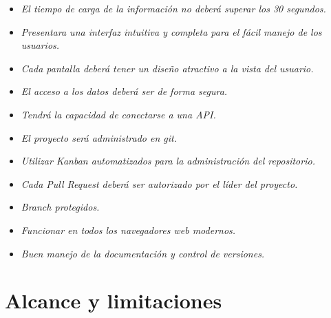 \documentclass[12pt,a4paper]{book}
\begin{document}
\begin{itemize}
\item \textit{El tiempo de carga de la información no deberá superar los 30 segundos.}
\item \textit{Presentara una interfaz intuitiva y completa para el fácil manejo de los usuarios.}
\item \textit{Cada pantalla deberá tener un diseño atractivo a la vista del usuario.}
\item \textit{El acceso a los datos deberá ser de forma segura.}
\item \textit{Tendrá la capacidad de conectarse a una API.}
\item \textit{El proyecto será administrado en git.}
\item \textit{Utilizar Kanban automatizados para la administración del repositorio.}
\item \textit{Cada Pull Request deberá ser autorizado por el líder del proyecto.}
\item \textit{Branch protegidos.}
\item \textit{Funcionar en todos los navegadores web modernos.}
\item \textit{Buen manejo de la documentación y control de versiones.}
\end{itemize}

\chapter{Alcance y limitaciones}
\end{document}
